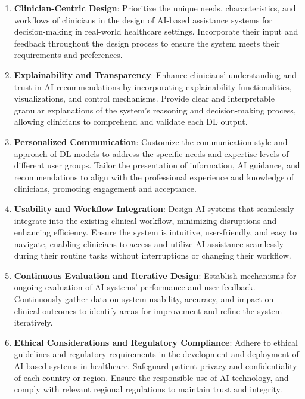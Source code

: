 \begin{enumerate}

\item {\bf Clinician-Centric Design}:
Prioritize the unique needs, characteristics, and workflows of clinicians in the design of \ac{AI}-based assistance systems for decision-making in real-world healthcare settings.
Incorporate their input and feedback throughout the design process to ensure the system meets their requirements and preferences.

\vspace{0.05mm}

\item {\bf Explainability and Transparency}:
Enhance clinicians' understanding and trust in \ac{AI} recommendations by incorporating explainability functionalities, visualizations, and control mechanisms.
Provide clear and interpretable granular explanations of the system's reasoning and decision-making process, allowing clinicians to comprehend and validate each \ac{DL} output.

\vspace{0.05mm}

\item {\bf Personalized Communication}:
Customize the communication style and approach of \ac{DL} models to address the specific needs and expertise levels of different user groups.
Tailor the presentation of information, \ac{AI} guidance, and recommendations to align with the professional experience and knowledge of clinicians, promoting engagement and acceptance.

\vspace{0.05mm}

\item {\bf Usability and Workflow Integration}:
Design \ac{AI} systems that seamlessly integrate into the existing clinical workflow, minimizing disruptions and enhancing efficiency.
Ensure the system is intuitive, user-friendly, and easy to navigate, enabling clinicians to access and utilize \ac{AI} assistance seamlessly during their routine tasks without interruptions or changing their workflow.

\vspace{0.05mm}

\item {\bf Continuous Evaluation and Iterative Design}:
Establish mechanisms for ongoing evaluation of \ac{AI} systems' performance and user feedback.
Continuously gather data on system usability, accuracy, and impact on clinical outcomes to identify areas for improvement and refine the system iteratively.

\vspace{0.05mm}

\item {\bf Ethical Considerations and Regulatory Compliance}:
Adhere to ethical guidelines and regulatory requirements in the development and deployment of \ac{AI}-based systems in healthcare.
Safeguard patient privacy and confidentiality of each country or region.
Ensure the responsible use of \ac{AI} technology, and comply with relevant regional regulations to maintain trust and integrity.

\end{enumerate}

